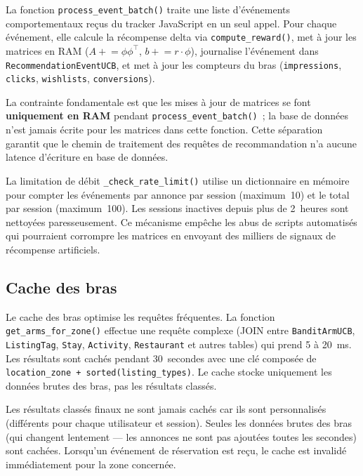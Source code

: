 La fonction \texttt{process\_event\_batch()} traite une liste d'événements comportementaux
reçus du tracker JavaScript en un seul appel. Pour chaque événement, elle calcule la
récompense delta via \texttt{compute\_reward()}, met à jour les matrices en RAM
($A \mathrel{+}= \phi\phi^\top$, $b \mathrel{+}= r \cdot \phi$), journalise l'événement
dans \texttt{RecommendationEventUCB}, et met à jour les compteurs du bras
(\texttt{impressions}, \texttt{clicks}, \texttt{wishlists}, \texttt{conversions}).

La contrainte fondamentale est que les mises à jour de matrices se font \textbf{uniquement
en RAM} pendant \texttt{process\_event\_batch()}~; la base de données n'est jamais écrite
pour les matrices dans cette fonction. Cette séparation garantit que le chemin de traitement
des requêtes de recommandation n'a aucune latence d'écriture en base de données.

La limitation de débit \texttt{\_check\_rate\_limit()} utilise un dictionnaire en mémoire pour
compter les événements par annonce par session (maximum~10) et le total par session
(maximum~100). Les sessions inactives depuis plus de 2~heures sont nettoyées paresseusement.
Ce mécanisme empêche les abus de scripts automatisés qui pourraient corrompre les matrices
en envoyant des milliers de signaux de récompense artificiels.


\subsection{Cache des bras}

Le cache des bras optimise les requêtes fréquentes. La fonction \texttt{get\_arms\_for\_zone()}
effectue une requête complexe (JOIN entre \texttt{BanditArmUCB}, \texttt{ListingTag},
\texttt{Stay}, \texttt{Activity}, \texttt{Restaurant} et autres tables) qui prend 5 à
20~ms. Les résultats sont cachés pendant 30~secondes avec une clé composée de
\texttt{location\_zone + sorted(listing\_types)}. Le cache stocke uniquement les données
brutes des bras, pas les résultats classés.

Les résultats classés finaux ne sont jamais cachés car ils sont personnalisés (différents
pour chaque utilisateur et session). Seules les données brutes des bras (qui changent
lentement --- les annonces ne sont pas ajoutées toutes les secondes) sont cachées. Lorsqu'un
événement de réservation est reçu, le cache est invalidé immédiatement pour la zone concernée.


